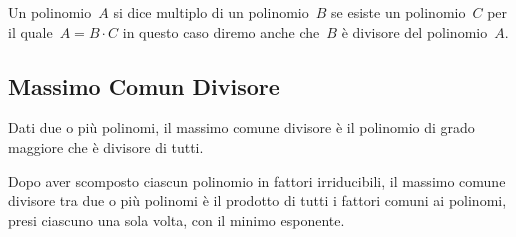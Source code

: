 Un polinomio~\(A\) si dice multiplo di un 
polinomio~\(B\) 
se esiste un polinomio~\(C\) per il quale~\(A=B\cdot C\) in questo caso 
diremo anche che~\(B\) è divisore del polinomio~\(A\).

\subsection{Massimo Comun Divisore}

\begin{definizione}{}{}
Dati due o più polinomi, il massimo comune divisore è il polinomio 
di grado maggiore che è divisore di tutti.
\end{definizione}

% 


\begin{teorema}{}{}
Dopo aver scomposto ciascun polinomio in fattori irriducibili, il massimo 
comune divisore tra due o più polinomi è il prodotto di tutti i fattori 
comuni ai polinomi, presi ciascuno una sola volta, con il minimo 
esponente.
\end{teorema}



